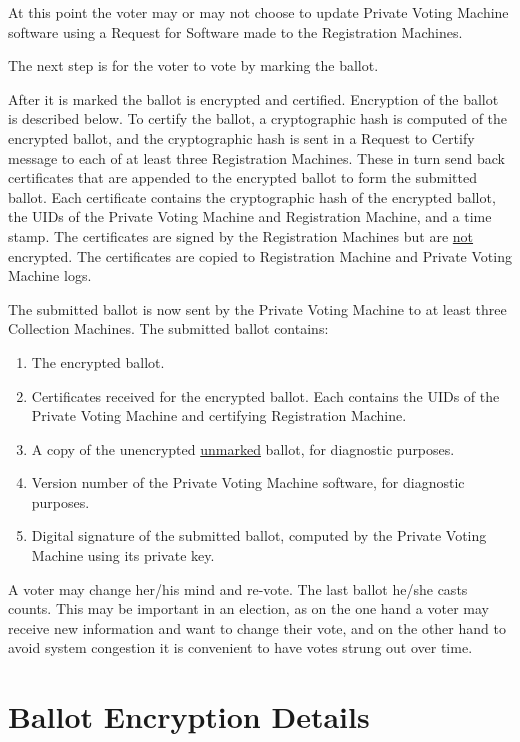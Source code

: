 \documentclass[12pt]{article}
\begin{document}
At this point
the voter may or may not choose to update Private Voting Machine
software using a Request for Software made to the Registration Machines.

The next step is for the voter to vote by marking the ballot.

After it is marked the ballot is encrypted and certified.  Encryption of the
ballot is described below.  To certify the ballot, a cryptographic hash
is computed of the encrypted ballot, and the cryptographic hash is sent
in a Request to Certify message to each of at least three Registration
Machines.  These in turn send back certificates that are appended
to the encrypted ballot to form the submitted ballot.  Each
certificate contains the cryptographic hash of the encrypted ballot, the
UIDs of the Private Voting Machine and Registration Machine,
and a time stamp.  The certificates
are signed by the Registration Machines but are \underline{not} encrypted.
The certificates are copied to Registration Machine and Private Voting
Machine logs.

The submitted ballot is now sent by the Private Voting
Machine to at least three Collection Machines.  The submitted
ballot contains:
\begin{enumerate}
\item The encrypted ballot.
\item Certificates received for the encrypted ballot.  Each contains the
UIDs of the Private Voting Machine and certifying Registration Machine.
\item A copy of the unencrypted \underline{unmarked} ballot, for
diagnostic purposes.
\item Version number of the Private Voting Machine software, for
diagnostic purposes.
\item Digital signature of the submitted ballot, computed by the
Private Voting Machine using its private key.
\end{enumerate}


A voter may change her/his mind and re-vote.  The last ballot
he/she casts counts.  This may be important in an election,
as on the one hand a voter may receive new information and
want to change their vote, and on the other hand to avoid system
congestion it is convenient to have votes strung out over time.

\section{Ballot Encryption Details}
\end{document}
